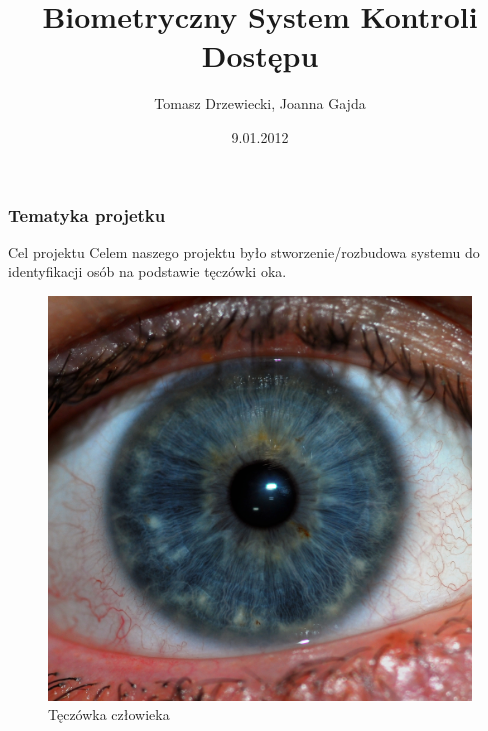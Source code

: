 \documentclass{beamer}
\title[Biometryczny System Kontroli Dostępu]{Biometryczny System Kontroli Dostępu}
\author[T. Drzewiecki, J. Gajda]{Tomasz Drzewiecki, Joanna Gajda}
\date[2012]{9.01.2012}
\institute[AGH-UST]
{Wydział Elektrotechniki, Automatyki, Informatyki i Elektroniki\\ 
Katedra Automatyki
}
\begin{document}
{
 \begin{frame}
   \titlepage
 \end{frame}
}


\begin{frame}
\frametitle{Tematyka projetku}

\begin{block}{Cel projektu}
Celem naszego projektu było stworzenie/rozbudowa systemu do identyfikacji osób na podstawie tęczówki oka.
\end{block}

\begin{figure}
\begin{center}
\includegraphics[scale=0.04]{teczowka.jpg}
\caption{Tęczówka człowieka}
\end{center}
\end{figure}

\end{frame}
\end{document}
